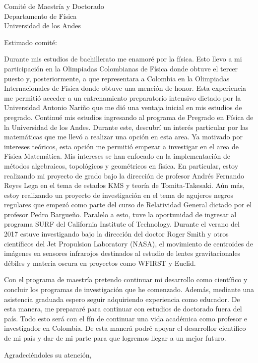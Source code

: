\documentclass{letter}
\begin{document}
\begin{letter}{Comité de Maestría y Doctorado \\ Departamento de Física \\ Universidad de los Andes}

\opening{Estimado comité:}

Durante mis estudios de bachillerato me enamoré por la física. Esto llevo a mi participación en la Olimpiadas Colombianas de Física donde obtuve el tercer puesto y, posteriormente, a que representara a Colombia en la Olimpiadas Internacionales de Física donde obtuve una mención de honor. Esta experiencia me permitió acceder a un entrenamiento preparatorio intensivo dictado por la Universidad Antonio Nariño que me dió una ventaja inicial en mis estudios de pregrado. Continué mis estudios ingresando al programa de Pregrado en Física de la Universidad de los Andes. Durante este, descubrí un interés particular por las matemáticas que me llevó a realizar una opción en esta area. Ya motivado por intereses teóricos, esta opción me permitió empezar a investigar en el area de Física Matemática. Mis intereses se han enfocado en la implementación de métodos algebraicos, topológicos y geométricos en física. En particular, estoy realizando mi proyecto de grado bajo la dirección de profesor Andrés Fernando Reyes Lega en el tema de estados KMS y teoría de Tomita-Takesaki. Aún más, estoy realizando un proyecto de investigación en el tema de agujeros negros regulares que empezó como parte del curso de Relatividad General dictado por el profesor Pedro Bargueño. Paralelo a esto, tuve la oportunidad de ingresar al programa SURF del California Institute of Technology. Durante el verano del 2017 estuve investigando bajo la dirección del doctor Roger Smith y otros científicos del Jet Propulsion Laboratory (NASA), el movimiento de centroides de imágenes en sensores infrarojos destinados al estudio de lentes gravitacionales débiles y materia oscura en proyectos como WFIRST y Euclid.  

Con el programa de maestría pretendo continuar mi desarrollo como científico y concluir los programas de investigación que he comenzado. Además, mediante una asistencia graduada espero seguir adquiriendo experiencia como educador. De esta manera, me prepararé para continuar con estudios de doctorado fuera del país. Todo esto será con el fín de continuar una vida académica como profesor e investigador en Colombia. De esta manerá podré apoyar el desarrollor científico de mi país y dar de mi parte para que logremos llegar a un mejor futuro.

\closing{Agradeciéndoles su atención,}

\end{letter}
\end{document}
